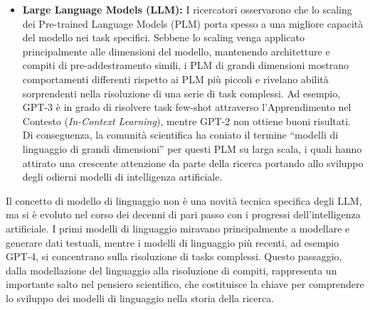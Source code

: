 \begin{itemize}
    Successivamente è stato introdotto BERT, un modello basato sull'architettura Transformer, nota per la sua elevata parallelizzazione per i meccanismi di self-attention. BERT sfrutta queste caratteristiche per apprendere rappresentazioni linguistiche bidirezionali, utilizzando task specifici su enormi corpi di testi non etichettati. Queste rappresentazioni contestuali e pre-addestrate delle parole si rivelano molto efficaci come features semantiche di uso generale, innalzando notevolmente gli standard di prestazione nei task di NLP. Questo studio ha ispirato un gran numero di lavori successivi, stabilendo il paradigma di apprendimento basato su \enquote{pre-training e fine-tuning}. Seguendo questa metodologia, è stato sviluppato un elevato numero di studi su modelli di linguaggio pre-addestrati (PLM), che hanno introdotto architetture differenti (es. GPT-2 e BART) oppure strategie di pre-addestramento migliorate.
    \item \textbf{Large Language Models (LLM):} I ricercatori osservarono che lo scaling dei Pre-trained Language Models (PLM) porta spesso a una migliore capacità del modello nei task specifici.
    Sebbene lo scaling venga applicato principalmente alle dimensioni del modello, mantenendo architetture e compiti di pre-addestramento simili, i PLM di grandi dimensioni mostrano comportamenti differenti rispetto ai PLM più piccoli e rivelano abilità sorprendenti nella risoluzione di una serie di task complessi. Ad esempio, GPT-3 è in grado di risolvere task few-shot attraverso l'Apprendimento nel Contesto (\textit{In-Context Learning}), mentre GPT-2 non ottiene buoni risultati. Di conseguenza, la comunità scientifica ha coniato il termine \enquote{modelli di linguaggio di grandi dimensioni} per questi PLM su larga scala, i quali hanno attirato una crescente attenzione da parte della ricerca portando allo sviluppo degli odierni modelli di intelligenza artificiale.
\end{itemize}

Il concetto di modello di linguaggio non è una novità tecnica specifica degli LLM, ma si è evoluto nel corso dei decenni di pari passo con i progressi dell'intelligenza artificiale. I primi modelli di linguaggio miravano principalmente a modellare e generare dati testuali, mentre i modelli di linguaggio più recenti, ad esempio GPT-4, si concentrano sulla risoluzione di tasks complessi. Questo passaggio, dalla modellazione del linguaggio alla risoluzione di compiti, rappresenta un importante salto nel pensiero scientifico, che costituisce la chiave per comprendere lo sviluppo dei modelli di linguaggio nella storia della ricerca.

